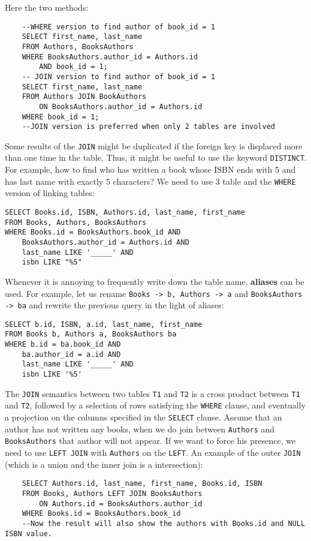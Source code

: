 \documentclass[a4page, 11pt]{article}
\theoremstyle{definition}
\begin{document}
Here the two methods:

\begin{lstlisting}
	--WHERE version to find author of book_id = 1
	SELECT first_name, last_name
	FROM Authors, BooksAuthors
	WHERE BooksAuthors.author_id = Authors.id
		AND book_id = 1;
	-- JOIN version to find author of book_id = 1
	SELECT first_name, last_name
	FROM Authors JOIN BookAuthors
		ON BooksAuthors.author_id = Authors.id
	WHERE book_id = 1;
	--JOIN version is preferred when only 2 tables are involved
\end{lstlisting}

Some results of the \texttt{JOIN} might be duplicated if the foreign key is displaced more than one time in the table. Thus, it might be useful to use the keyword \texttt{DISTINCT}.
For example, how to find who has written a book whose ISBN ends with 5 and has last name with exactly 5 characters? We need to use 3 table and the \texttt{WHERE} version of linking tables: %
\begin{lstlisting}
SELECT Books.id, ISBN, Authors.id, last_name, first_name
FROM Books, Authors, BooksAuthors
WHERE Books.id = BooksAuthors.book_id AND
	BooksAuthors.author_id = Authors.id AND
	last_name LIKE '_____' AND
	isbn LIKE "%5"
\end{lstlisting}

Whenever it is annoying to frequently write down the table name, \textbf{aliases} can be used.
For example, let us rename \texttt{Books -> b, Authors -> a} and \texttt{BooksAuthors -> ba} and rewrite the previous query in the light of aliases:
\begin{lstlisting}
SELECT b.id, ISBN, a.id, last_name, first_name
FROM Books b, Authors a, BooksAuthors ba
WHERE b.id = ba.book_id AND
	ba.author_id = a.id AND	
	last_name LIKE '_____' AND
	isbn LIKE '%5'
\end{lstlisting}
The \texttt{JOIN} semantics between two tables \texttt{T1} and \texttt{T2} is a cross product between \texttt{T1} and \texttt{T2}, followed by a selection of rows satisfying the \texttt{WHERE} clause, and eventually  a projection on the columns specified in the \texttt{SELECT} clause.\newline
Assume that an author has not written any books, when we do join between \texttt{Authors} and \texttt{BooksAuthors} that author will not appear. 
If we want to force his presence, we need to use \texttt{LEFT JOIN} with \texttt{Authors} on the \texttt{LEFT}. An example of the outer \texttt{JOIN} (which is a union and the inner join is a intersection):
\begin{lstlisting}
	SELECT Authors.id, last_name, first_name, Books.id, ISBN
	FROM Books, Authors LEFT JOIN BooksAuthors
		ON Authors.id = BooksAuthors.author_id
	WHERE Books.id = BooksAuthors.book_id
	--Now the result will also show the authors with Books.id and NULL ISBN value.
\end{lstlisting}
\end{document}
